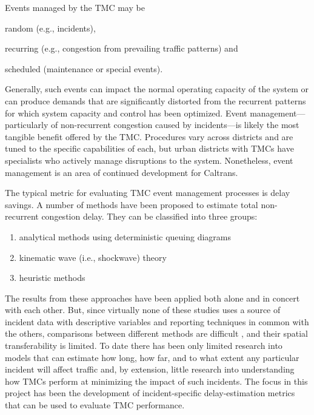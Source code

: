 \documentclass[12pt]{report}
\begin{document}
Events managed by the \ac{TMC} may be
\begin{inparaenum}[(1)]
\item random (e.g., incidents),
\item recurring (e.g., congestion from prevailing traffic patterns)
  and
\item scheduled (maintenance or special events).
\end{inparaenum}
Generally, such events can impact the normal operating capacity of the
system or can produce demands that are significantly distorted from
the recurrent patterns for which system capacity and control has been
optimized.  Event management---particularly of non-recurrent
congestion caused by incidents---is likely the most tangible benefit
offered by the \ac{TMC}. Procedures vary across districts and are
tuned to the specific capabilities of each, but urban districts with
\acp{TMC} have specialists who actively manage disruptions to the
system. Nonetheless, event management is an area of continued
development for Caltrans.

The typical metric for evaluating \ac{TMC} event management processes is
delay savings. A number of methods have been proposed to estimate
total non-recurrent congestion delay.  They can be classified into
three groups:
\begin{enumerate}
\item analytical methods using deterministic queuing diagrams
  \protect\citep[e.g.,]{goolsby71:_influen_of_incid_freew_qualit_of_servic,chow74:_study_of_traff_perfor_model,morales87:_analy_proced_for_estim_freew_traff_conges,trb94:_highw_capac_manual,lawson97:_using_input_output_diagr_to,erera98:_simpl_gener_method_for_analy,skabardonis04:_devel_and_applic_of_method}
\item kinematic wave (i.e., shockwave) theory \citep[e.g.,]{chow74:_study_of_traff_perfor_model,wirasinghe78:_deter_of_traff_delay_from,heydecker94:_incid_and_inter_freew,al-deek95:_new_method_for_estim_freew_incid_conges}
\item heuristic methods \citep[e.g.,]{skabardonis96:_i_field_exper,skabardonis03:_measur_recur_and_nonrec_traff_conges}
\end{enumerate}
The results from these approaches have been applied both alone and in concert
with each other. But, since virtually none of these studies uses a source of
incident data with descriptive variables and reporting techniques in common with
the others, comparisons between different methods are difficult
\citep{goolsby71:_influen_of_incid_freew_qualit_of_servic}, and their spatial
transferability is limited. To date there has been only limited research into
models that can estimate how long, how far, and to what extent any particular
incident will affect traffic and, by extension, little research into
understanding how \acp{TMC} perform at minimizing the impact of such incidents.
The focus in this project has been the development of incident-specific
delay-estimation metrics that can be used to evaluate \ac{TMC} performance.
\end{document}
